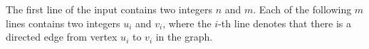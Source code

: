The first line of the input contains two integers $n$ and $m$.
Each of the following $m$ lines contains two integers $u_i$ and $v_i$, where the $i$-th line denotes that there is a directed edge from vertex $u_i$ to $v_i$ in the graph.